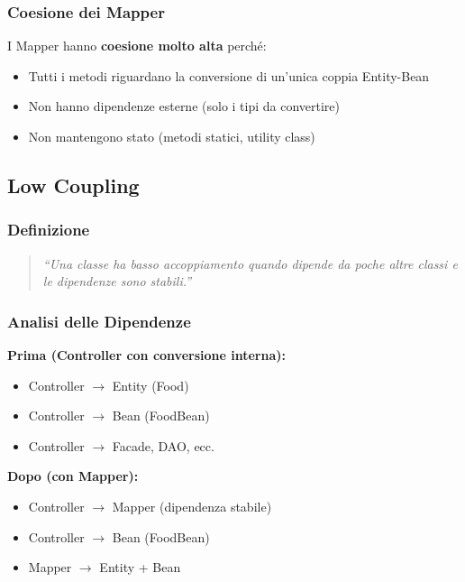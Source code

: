 \documentclass[12pt,a4paper]{article}
\begin{document}
\subsubsection{Coesione dei Mapper}

I Mapper hanno \textbf{coesione molto alta} perché:
\begin{itemize}
    \item Tutti i metodi riguardano la conversione di un'unica coppia Entity-Bean
    \item Non hanno dipendenze esterne (solo i tipi da convertire)
    \item Non mantengono stato (metodi statici, utility class)
\end{itemize}

\subsection{Low Coupling}

\subsubsection{Definizione}

\begin{quote}
\textit{``Una classe ha basso accoppiamento quando dipende da poche altre classi e le dipendenze sono stabili.''}
\end{quote}

\subsubsection{Analisi delle Dipendenze}

\textbf{Prima (Controller con conversione interna):}
\begin{itemize}
    \item Controller $\rightarrow$ Entity (Food)
    \item Controller $\rightarrow$ Bean (FoodBean)
    \item Controller $\rightarrow$ Facade, DAO, ecc.
\end{itemize}

\textbf{Dopo (con Mapper):}
\begin{itemize}
    \item Controller $\rightarrow$ Mapper (dipendenza stabile)
    \item Controller $\rightarrow$ Bean (FoodBean)
    \item Mapper $\rightarrow$ Entity + Bean
\end{itemize}
\end{document}
